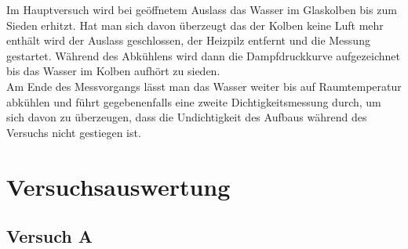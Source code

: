 \documentclass[12pt,a4paper]{article}
\begin{document}
Im Hauptversuch wird bei geöffnetem Auslass das Wasser im Glaskolben bis zum Sieden erhitzt. Hat man sich davon überzeugt das der Kolben keine Luft mehr enthält wird der Auslass geschlossen, der Heizpilz entfernt und die Messung gestartet. Während des Abkühlens wird dann die Dampfdruckkurve aufgezeichnet bis das Wasser im Kolben aufhört zu sieden.\\
Am Ende des Messvorgangs lässt man das Wasser weiter bis auf Raumtemperatur abkühlen und führt gegebenenfalls eine zweite Dichtigkeitsmessung durch, um sich davon zu überzeugen, dass die Undichtigkeit des Aufbaus während des Versuchs nicht gestiegen ist. 

\section{Versuchsauswertung}
\subsection{Versuch A}
\end{document}
